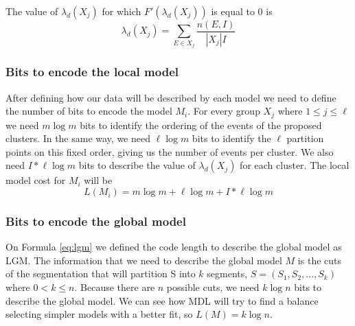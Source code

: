   The value of $\lambda_d(X_j)$ for which $F'(\lambda_d(X_j))$ is equal to 0 is $$\lambda_d(X_j)=\sum_{E \in X_j}\frac{n(E,I)}{|X_j| I}$$
  
\subsubsection{Bits to encode the local model}

After defining how our data will be described by each model we need to define the number of bits to encode the model $M_i$. For every group $X_j$ where $1 \leq j \leq \ell$ we need $m \log m$ bits to identify the ordering of the events of the proposed clusters. In the same way, we need $\ell \log m$ bits to identify the $\ell$ partition points on this fixed order, giving us the number of events per cluster. We also need $I * \ell \log m$ bits to describe the value of $\lambda_d(X_j)$ for each cluster. The local model cost for $M_i$ will be
\begin{equation*}
L(M_i) =  m\log m + \ell \log m + I * \ell \log m
\end{equation*}

\subsubsection{Bits to encode the global model}

On Formula \ref{eq:lgm}  we defined the code length to describe the global model as LGM. 
The information that we need to describe the global model $M$ is the cuts of the segmentation that will partition S into $k$ segments, $S = (S_1, S_2, ..., S_k )$ where $0 < k \leq n$. Because there are $n$ possible cuts, we need $k \log n$ bits to describe the global model. We can see how MDL will try to find a balance selecting simpler models with a better fit, so $L(M) =  k \log n$.
%







